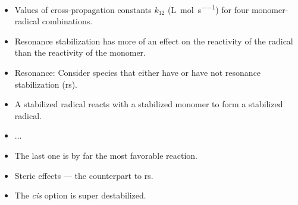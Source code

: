 \documentclass[../notes.tex]{subfiles}
\begin{document}
\begin{itemize}
\begin{itemize}
        \item Values of cross-propagation constants $k_{12}$ (\si{\liter\per\mole\per\second}) for four monomer-radical combinations.
        \item Resonance stabilization has more of an effect on the reactivity of the radical than the reactivity of the monomer.
        \item Resonance: Consider species that either have or have not resonance stabilization (rs).
        \item A stabilized radical reacts with a stabilized monomer to form a stabilized radical.
        \item ...
        \item The last one is by far the most favorable reaction.
        \item Steric effects --- the counterpart to rs.
        \item The \emph{cis} option is super destabilized.
    \end{itemize}
\end{itemize}
\end{document}
